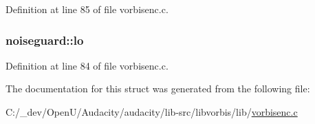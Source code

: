 Definition at line 85 of file vorbisenc.\+c.

\subsubsection[{\texorpdfstring{lo}{lo}}]{ noiseguard\+::lo}\hypertarget{structnoiseguard_a536d7b7c61ad24a4f7b490f663d43dad}{}\label{structnoiseguard_a536d7b7c61ad24a4f7b490f663d43dad}


Definition at line 84 of file vorbisenc.\+c.



The documentation for this struct was generated from the following file\+:\begin{DoxyCompactItemize}
\item 
C\+:/\+\_\+dev/\+Open\+U/\+Audacity/audacity/lib-\/src/libvorbis/lib/\hyperlink{vorbisenc_8c}{vorbisenc.\+c}\end{DoxyCompactItemize}
